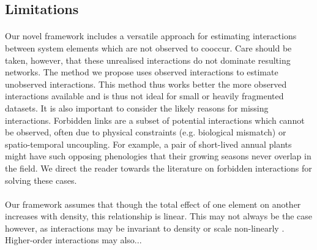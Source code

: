 \documentclass[a4,12pt]{article}
\begin{document}
     


   \subsection{Limitations}


        
        \paragraph{}
        Our novel framework includes a versatile approach for estimating interactions between system elements which are not observed to cooccur. Care should be taken, however, that these unrealised interactions do not dominate resulting networks. The method we propose uses observed interactions to estimate unobserved interactions. This method thus works better the more observed interactions available and is thus not ideal for small or heavily fragmented datasets. It is also important to consider the likely reasons for missing interactions. Forbidden links are a subset of potential interactions which cannot be observed, often due to physical constraints (e.g. biological mismatch) or spatio-temporal uncoupling. For example, a pair of short-lived annual plants might have such opposing phenologies that their growing seasons never overlap in the field. We direct the reader towards the literature on forbidden interactions \parencite{Olesen2011, Jordano2016} for solving these cases. 

        \paragraph{}
        Our framework assumes that though the total effect of one element on another increases with density, this relationship is linear. This may not always be the case however, as interactions may be invariant to density \parencite{} or scale non-linearly \parencite{}. Higher-order interactions may also...
\end{document}
